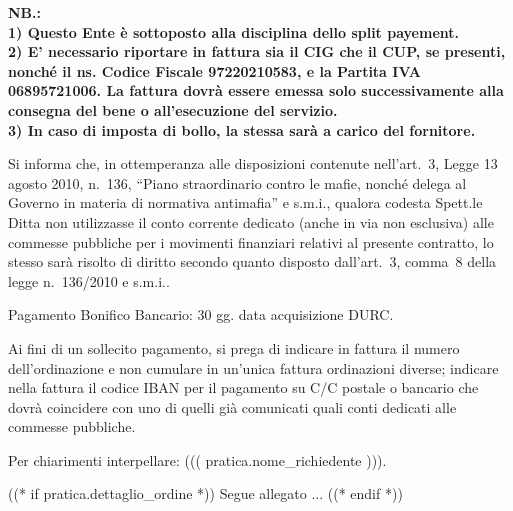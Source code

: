 \documentclass[a4paper,12pt]{letter}
\begin{document}
{\tiny\bf NB.: \\
1) Questo Ente è sottoposto alla disciplina dello split payement. \\
2) E' necessario riportare in fattura sia il CIG che il CUP, se presenti,
nonché il ns. Codice Fiscale 97220210583, e la Partita IVA 06895721006.
La fattura dovrà essere emessa solo successivamente alla consegna del bene o all’esecuzione del servizio.\\
3) In caso di imposta di bollo, la stessa sarà a carico del fornitore.

Si informa che, in ottemperanza alle disposizioni contenute nell'art.~3, Legge 13 agosto 2010, n.~136,
``Piano straordinario contro le mafie, nonch\'e delega al Governo in materia di normativa antimafia''
e s.m.i., qualora codesta Spett.le Ditta non utilizzasse il conto corrente dedicato 
(anche in via non esclusiva) alle commesse pubbliche per i movimenti finanziari 
relativi al presente contratto, lo stesso sarà risolto di diritto secondo quanto 
disposto dall'art.~3, comma~8 della legge n.~136/2010 e s.m.i..

Pagamento Bonifico Bancario: 30 gg. data acquisizione DURC.

Ai fini di un sollecito pagamento, si prega di
indicare in fattura il numero dell'ordinazione e non cumulare in un'unica fattura 
ordinazioni diverse;
indicare nella fattura il codice IBAN per il pagamento su C/C postale o bancario 
che dovrà coincidere con uno di quelli già comunicati quali conti dedicati alle commesse pubbliche.

Per chiarimenti interpellare: ((( pratica.nome_richiedente ))).
}

((* if pratica.dettaglio_ordine *))
\vspace{0.5cm}
\flushright
Segue allegato ...
\newpage
\vspace{2cm}
\quad
((* endif *))

\vspace{1cm}
\end{document}
